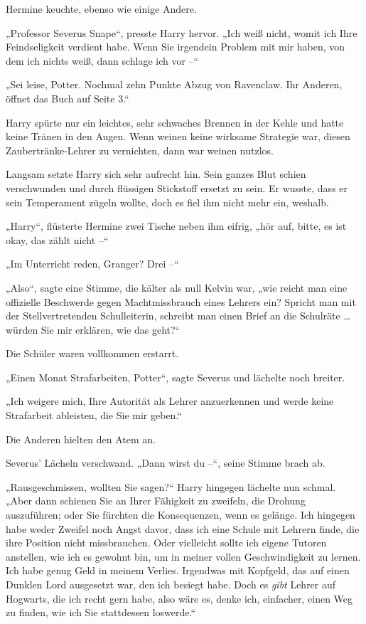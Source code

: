 Hermine keuchte, ebenso wie einige Andere. 

„Professor Severus Snape“, presste Harry hervor. „Ich weiß nicht, womit ich Ihre Feindseligkeit verdient habe. Wenn Sie irgendein Problem mit mir haben, von dem ich nichts weiß, dann schlage ich vor –“ 

„Sei leise, Potter. Nochmal zehn Punkte Abzug von Ravenclaw. Ihr Anderen, öffnet das Buch auf Seite 3.“ 

Harry spürte nur ein leichtes, sehr schwaches Brennen in der Kehle und hatte keine Tränen in den Augen. Wenn weinen keine wirksame Strategie war, diesen Zaubertränke-Lehrer zu vernichten, dann war weinen nutzlos. 

Langsam setzte Harry sich sehr aufrecht hin. Sein ganzes Blut schien verschwunden und durch flüssigen Stickstoff ersetzt zu sein. Er wusste, dass er sein Temperament zügeln wollte, doch es fiel ihm nicht mehr ein, weshalb. 

„Harry“, flüsterte Hermine zwei Tische neben ihm eifrig, „hör auf, bitte, es ist okay, das zählt nicht –“ 

„Im Unterricht reden, Granger? Drei –“ 

„Also“, sagte eine Stimme, die kälter als null Kelvin war, „wie reicht man eine offizielle Beschwerde gegen Machtmissbrauch eines Lehrers ein? Spricht man mit der Stellvertretenden Schulleiterin, schreibt man einen Brief an die Schulräte … würden Sie mir erklären, wie das geht?“ 

Die Schüler waren vollkommen erstarrt. 

„Einen Monat Strafarbeiten, Potter“, sagte Severus und lächelte noch breiter. 

„Ich weigere mich, Ihre Autorität als Lehrer anzuerkennen und werde keine Strafarbeit ableisten, die Sie mir geben.“ 

Die Anderen hielten den Atem an. 

Severus’ Lächeln verschwand. „Dann wirst du –“, seine Stimme brach ab. 

„Rausgeschmissen, wollten Sie sagen?“ Harry hingegen lächelte nun schmal. „Aber dann schienen Sie an Ihrer Fähigkeit zu zweifeln, die Drohung auszuführen; oder Sie fürchten die Konsequenzen, wenn es gelänge. Ich hingegen habe weder Zweifel noch Angst davor, dass ich eine Schule mit Lehrern finde, die ihre Position nicht missbrauchen. Oder vielleicht sollte ich eigene Tutoren anstellen, wie ich es gewohnt bin, um in meiner vollen Geschwindigkeit zu lernen. Ich habe genug Geld in meinem Verlies. Irgendwas mit Kopfgeld, das auf einen Dunklen Lord ausgesetzt war, den ich besiegt habe. Doch es \emph{gibt} Lehrer auf Hogwarts, die ich recht gern habe, also wäre es, denke ich, einfacher, einen Weg zu finden, wie ich Sie stattdessen loswerde.“ 

